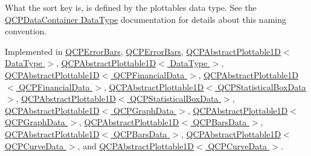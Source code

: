 What the sort key is, is defined by the plottable\textquotesingle{}s data type. See the \hyperlink{class_q_c_p_data_container_qcpdatacontainer-datatype}{Q\+C\+P\+Data\+Container Data\+Type} documentation for details about this naming convention. 

Implemented in \hyperlink{class_q_c_p_error_bars_ade1d7b893397eb0ebdaca79d3e2495f6}{Q\+C\+P\+Error\+Bars}, \hyperlink{class_q_c_p_error_bars_a2b37b7ddb99e9e3ff76ac8f4172b7ee4}{Q\+C\+P\+Error\+Bars}, \hyperlink{class_q_c_p_abstract_plottable1_d_acee921e5fcbdd82d1864d361a12f8971}{Q\+C\+P\+Abstract\+Plottable1\+D$<$ Data\+Type $>$}, \hyperlink{class_q_c_p_abstract_plottable1_d_acee62e95f889d32f43b151706e478aac}{Q\+C\+P\+Abstract\+Plottable1\+D$<$ Data\+Type $>$}, \hyperlink{class_q_c_p_abstract_plottable1_d_acee921e5fcbdd82d1864d361a12f8971}{Q\+C\+P\+Abstract\+Plottable1\+D$<$ Q\+C\+P\+Financial\+Data $>$}, \hyperlink{class_q_c_p_abstract_plottable1_d_acee62e95f889d32f43b151706e478aac}{Q\+C\+P\+Abstract\+Plottable1\+D$<$ Q\+C\+P\+Financial\+Data $>$}, \hyperlink{class_q_c_p_abstract_plottable1_d_acee921e5fcbdd82d1864d361a12f8971}{Q\+C\+P\+Abstract\+Plottable1\+D$<$ Q\+C\+P\+Statistical\+Box\+Data $>$}, \hyperlink{class_q_c_p_abstract_plottable1_d_acee62e95f889d32f43b151706e478aac}{Q\+C\+P\+Abstract\+Plottable1\+D$<$ Q\+C\+P\+Statistical\+Box\+Data $>$}, \hyperlink{class_q_c_p_abstract_plottable1_d_acee921e5fcbdd82d1864d361a12f8971}{Q\+C\+P\+Abstract\+Plottable1\+D$<$ Q\+C\+P\+Graph\+Data $>$}, \hyperlink{class_q_c_p_abstract_plottable1_d_acee62e95f889d32f43b151706e478aac}{Q\+C\+P\+Abstract\+Plottable1\+D$<$ Q\+C\+P\+Graph\+Data $>$}, \hyperlink{class_q_c_p_abstract_plottable1_d_acee921e5fcbdd82d1864d361a12f8971}{Q\+C\+P\+Abstract\+Plottable1\+D$<$ Q\+C\+P\+Bars\+Data $>$}, \hyperlink{class_q_c_p_abstract_plottable1_d_acee62e95f889d32f43b151706e478aac}{Q\+C\+P\+Abstract\+Plottable1\+D$<$ Q\+C\+P\+Bars\+Data $>$}, \hyperlink{class_q_c_p_abstract_plottable1_d_acee921e5fcbdd82d1864d361a12f8971}{Q\+C\+P\+Abstract\+Plottable1\+D$<$ Q\+C\+P\+Curve\+Data $>$}, and \hyperlink{class_q_c_p_abstract_plottable1_d_acee62e95f889d32f43b151706e478aac}{Q\+C\+P\+Abstract\+Plottable1\+D$<$ Q\+C\+P\+Curve\+Data $>$}.

